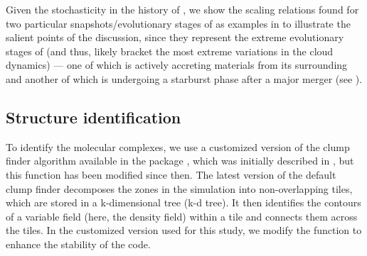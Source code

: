 \IfFileExists{emulateapjlegacy.cls}{\documentclass[iop]{emulateapjlegacy}}{\documentclass[iop]{emulateapj}}
\begin{document}
Given the stochasticity in the \SF history of \flower,
we show the scaling relations found for two particular snapshots/evolutionary stages of \flower
as examples in  to illustrate the salient points of the discussion,
since they represent the extreme evolutionary stages of \flower (and thus, likely bracket the
most extreme variations in the cloud dynamics) --- one of which \flower is
actively accreting materials from its surrounding 
and another of which \flower is undergoing
a starburst phase after a major merger (see ).


\subsection{Structure identification} \label{sec:method}
To identify the molecular complexes, we use a customized version of the clump finder algorithm available in the  package  \citep{Turk2011a}, which was initially described in \citet{Smith09a}, but this function has been modified since then.
%
The latest version of the default  clump finder decomposes the zones in the simulation into non-overlapping tiles, which are stored in a k-dimensional tree (k-d tree). It then identifies the contours of a variable field (here, the density field) within a tile and connects them across the tiles. 
In the customized version used for this study, we modify the function to enhance the stability of the code.
\end{document}
